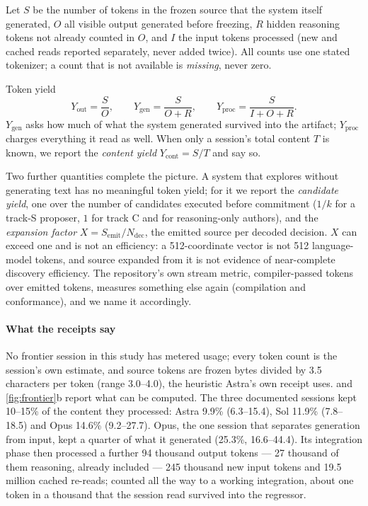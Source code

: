 Let $S$ be the number of tokens in the frozen source that the system itself generated, $O$ all
visible output generated before freezing, $R$ hidden reasoning tokens not already counted in $O$,
and $I$ the input tokens processed (new and cached reads reported separately, never added twice).
All counts use one stated tokenizer; a count that is not available is \emph{missing}, never zero.

\begin{definition}{Token yield}
\label{def:yield}
\begin{equation*}
Y_{\mathrm{out}} = \frac{S}{O}, \qquad
Y_{\mathrm{gen}} = \frac{S}{O+R}, \qquad
Y_{\mathrm{proc}} = \frac{S}{I+O+R}.
\end{equation*}
$Y_{\mathrm{gen}}$ asks how much of what the system generated survived into the artifact;
$Y_{\mathrm{proc}}$ charges everything it read as well. When only a session's total content $T$ is
known, we report the \emph{content yield} $Y_{\mathrm{cont}} = S/T$ and say so.
\end{definition}

Two further quantities complete the picture. A system that explores without generating text has no
meaningful token yield; for it we report the \emph{candidate yield}, one over the number of
candidates executed before commitment ($1/k$ for a track-S proposer, $1$ for track C and for
reasoning-only authors), and the \emph{expansion factor} $X = S_{\mathrm{emit}}/N_{\mathrm{dec}}$, the
emitted source per decoded decision. $X$ can exceed one and is not an efficiency: a 512-coordinate
vector is not 512 language-model tokens, and source expanded from it is not evidence of
near-complete discovery efficiency. The repository's own stream metric, compiler-passed tokens over
emitted tokens, measures something else again (compilation and conformance), and we name it
accordingly.

\paragraph{What the receipts say} No frontier session in this study has metered usage; every token
count is the session's own estimate, and source tokens are frozen bytes divided by 3.5 characters
per token (range 3.0--4.0), the heuristic Astra's own receipt uses.  and
\cref{fig:frontier}b report what can be computed. The three documented sessions kept 10--15\% of the
content they processed: Astra 9.9\% (6.3--15.4), Sol 11.9\% (7.8--18.5) and Opus 14.6\%
(9.2--27.7). Opus, the one session that separates generation from input, kept a quarter of what it
generated (25.3\%, 16.6--44.4). Its integration phase then processed a further 94 thousand output
tokens --- 27 thousand of them reasoning, already included --- 245 thousand new input tokens and 19.5
million cached re-reads; counted all the way to a working integration, about one token in a thousand
that the session read survived into the regressor.

